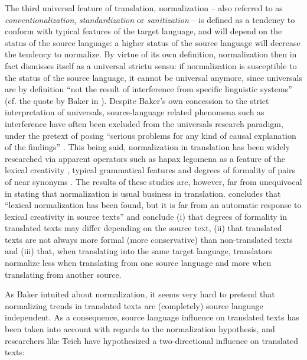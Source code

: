 The third universal feature of translation, normalization – also referred to as \textit{conventionalization}, \textit{standardization} or \textit{sanitization} \citep[23]{zanettin_corpus_2013} – is defined as a tendency to conform with typical features of the target language, and will depend on the status of the source language: a higher status of the source language will decrease the tendency to normalize. By virtue of its own definition, normalization then in fact dismisses itself as a universal strictu sensu: if normalization is susceptible to the status of the source language, it cannot be universal anymore, since universals are by definition “not the result of interference from specific linguistic systems” (cf. the quote by Baker in ). Despite Baker’s own concession to the strict interpretation of universals, source-language related phenomena such as interference have often been excluded from the universals research paradigm, under the pretext of posing “serious problems for any kind of causal explanation of the findings” \citep[311]{pym_tourys_2008}. This being said, normalization in translation has been widely researched via apparent operators such as hapax legomena as a feature of the lexical creativity \citep{kenny_lexis_2001}, typical grammatical features \citep{kranich_between_2011} and degrees of formality of pairs of near synonyms  \citep{DeSutterEtAl2012}. The results of these studies are, however, far from unequivocal in stating that normalization is usual business in translation. \citet[210]{kenny_lexis_2001} concludes that “lexical normalization has been found, but it is far from an automatic response to lexical creativity in source texts” and \citet[338]{oakes_lexical_2012} conclude (i) that degrees of formality in translated texts may differ depending on the source text, (ii) that translated texts are not always more formal (more conservative) than non-translated texts and (iii) that, when translating into the same target language, translators normalize less when translating from one source language and more when translating from another source.

As Baker intuited about normalization, it seems very hard to pretend that normalizing trends in translated texts are (completely) source language independent. As a consequence, source language influence on translated texts has been taken into account with regards to the normalization hypothesis, and researchers like Teich have hypothesized a two-directional influence on translated texts:

